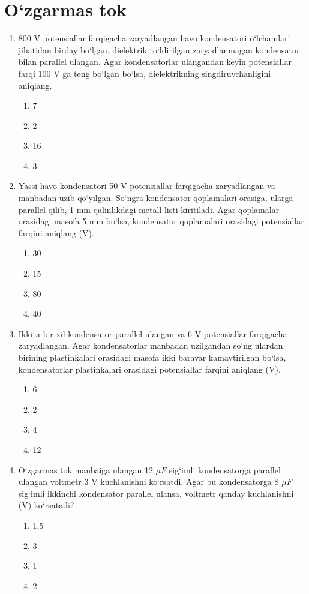 \section{O`zgarmas tok}



\begin{enumerate}

\item 800 V potensiallar farqigacha zaryadlangan havo kondensatori o‘lchamlari jihatidan birday bo‘lgan, dielektrik to‘ldirilgan zaryadlanmagan kondensator bilan parallel ulangan. Agar kondensatorlar ulangandan keyin potensiallar farqi 100 V ga teng bo‘lgan bo‘lsa, dielektrikning singdiruvchanligini aniqlang.
\begin{enumerate}[label=\Alph*)]
\item 7
\item 2
\item 16
\item 3
\end{enumerate}

\item Yassi havo kondensatori 50 V potensiallar farqigacha zaryadlangan va manbadan uzib qo‘yilgan. So‘ngra kondensator qoplamalari orasiga, ularga parallel qilib, 1 mm qalinlikdagi metall listi kiritiladi. Agar qoplamalar orasidagi masofa 5 mm bo‘lsa, kondensator qoplamalari orasidagi potensiallar farqini aniqlang (V).
\begin{enumerate}[label=\Alph*)]
\item 30
\item 15
\item 80
\item 40
\end{enumerate}

\item Ikkita bir xil kondensator parallel ulangan va 6 V potensiallar farqigacha zaryadlangan. Agar kondensatorlar manbadan uzilgandan so‘ng ulardan birining plastinkalari orasidagi masofa ikki baravar kamaytirilgan bo‘lsa, kondensatorlar plastinkalari orasidagi potensiallar farqini aniqlang (V).
\begin{enumerate}[label=\Alph*)]
\item 6
\item 2
\item 4
\item 12
\end{enumerate}

\item O‘zgarmas tok manbaiga ulangan 12 $\mu F$ sig‘imli kondensatorga parallel ulangan voltmetr 3 V kuchlanishni ko‘rsatdi. Agar bu kondensatorga 8 $\mu F$ sig‘imli ikkinchi kondensator parallel ulansa, voltmetr qanday kuchlanishni (V) ko‘rsatadi?
\begin{enumerate}[label=\Alph*)]
\item 1,5
\item 3
\item 1
\item 2
\end{enumerate}


\end{enumerate}
